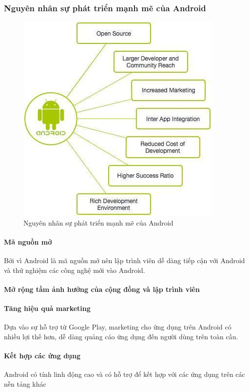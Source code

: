 \documentclass[a4paper]{article}
\begin{document}
\subsubsection{Nguyên nhân sự phát triển mạnh mẽ của Android}
\begin{center}
    \begin{figure}[h]
    \begin{center}
     \includegraphics[scale=.5]{why_android.jpg}
    \end{center}
    \caption{Nguyên nhân sự phát triển mạnh mẽ của Android}
    \label{refhinh1}
    \end{figure}
\end{center}
\paragraph*{Mã nguồn mở}
Bởi vì Android là mã nguồn mở nên lập trình viên dễ dàng tiếp cận với Android và thử nghiệm các công nghệ mới vào Android.
\paragraph*{Mở rộng tầm ảnh hưởng của cộng đồng và lập trình viên}
\paragraph*{Tăng hiệu quả marketing}
Dựa vào sự hỗ trợ từ Google Play, marketing cho ứng dụng trên Android có nhiều lợi thế hơn, dễ dàng quảng cáo ứng dụng đến người dùng trên toàn cầu.
\paragraph*{Kết hợp các ứng dụng}
Android có tính linh động cao và có hỗ trợ để kết hợp với các ứng dụng trên các nền tảng khác
\end{document}
